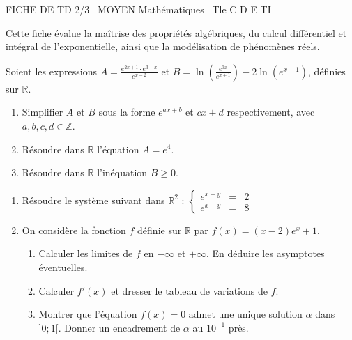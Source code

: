\documentclass[11pt]{article}
\begin{document}
\begin{tcolorbox}[enhanced,colback=popink,colframe=popink,arc=10pt,boxrule=0pt,left=12pt,right=12pt,top=9pt,bottom=9pt]
{\color{white}\popxbold\small FICHE DE TD 2/3 \textbullet\ MOYEN \hfill Mathématiques \textbullet\ Tle C D E TI\par}
\end{tcolorbox}
\vspace{4pt}
Cette fiche évalue la maîtrise des propriétés algébriques, du calcul différentiel et intégral de l'exponentielle, ainsi que la modélisation de phénomènes réels.

\begin{exercice}
Soient les expressions $A = \frac{e^{2x+1} \cdot e^{3-x}}{e^{x-2}}$ et $B = \ln\left(\frac{e^{3x}}{e^{x+1}}\right) - 2\ln(e^{x-1})$, définies sur $\mathbb{R}$.
\begin{enumerate}
    \item Simplifier $A$ et $B$ sous la forme $e^{ax+b}$ et $cx+d$ respectivement, avec $a,b,c,d \in \mathbb{Z}$.
    \item Résoudre dans $\mathbb{R}$ l'équation $A = e^4$.
    \item Résoudre dans $\mathbb{R}$ l'inéquation $B \geq 0$.
\end{enumerate}
\end{exercice}

\begin{exercice}
\begin{enumerate}
    \item Résoudre le système suivant dans $\mathbb{R}^2$ :
    $\left\{\begin{array}{rcl} e^{x+y} &=& 2 \\ e^{x-y} &=& 8 \end{array}\right.$
    \item On considère la fonction $f$ définie sur $\mathbb{R}$ par $f(x) = (x-2)e^{x} + 1$.
    \begin{enumerate}
        \item Calculer les limites de $f$ en $-\infty$ et $+\infty$. En déduire les asymptotes éventuelles.
        \item Calculer $f'(x)$ et dresser le tableau de variations de $f$.
        \item Montrer que l'équation $f(x) = 0$ admet une unique solution $\alpha$ dans $]0; 1[$. Donner un encadrement de $\alpha$ au $10^{-1}$ près.
    \end{enumerate}
\end{enumerate}
\end{exercice}
\end{document}
